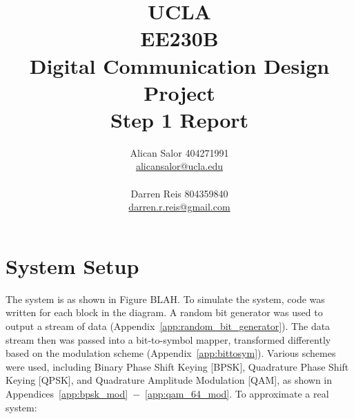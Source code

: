 \documentclass[]{article}
\title{UCLA\\EE230B\\Digital Communication Design Project\\Step 1 Report}
\author{Alican Salor 404271991 \\  \href{mailto:alicansalor@ucla.edu}{alicansalor@ucla.edu} \\ \\
Darren Reis 804359840 \\
\href{mailto:darrer.r.reis@gmail.com}{darren.r.reis@gmail.com} }
\begin{document}
\maketitle

\newpage
\tableofcontents

\newpage


\section{System Setup}
\label{sec:setup}
The system is as shown in Figure BLAH.  To simulate the system, code was written for each block in the diagram.  A random bit generator was used to output a stream of data (Appendix~\ref{app:random_bit_generator}).  The data stream then was passed into a bit-to-symbol mapper, transformed differently based on the modulation scheme (Appendix~\ref{app:bittosym}).  Various schemes were used, including Binary Phase Shift Keying [BPSK], Quadrature Phase Shift Keying [QPSK], and Quadrature Amplitude Modulation [QAM], as shown in Appendices~\ref{app:bpsk_mod}~$-$~\ref{app:qam_64_mod}. To approximate a real system:
\end{document}
